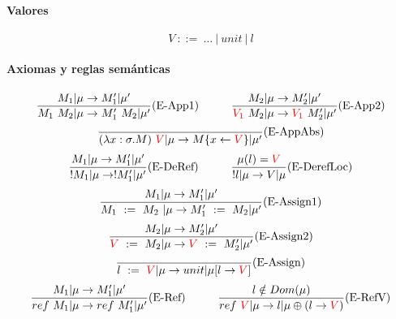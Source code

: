 \documentclass[10pt,a4paper]{article}
\begin{document}
\paragraph{Valores}
$$V~::=~\dots~|~unit~|~l$$

\paragraph{Axiomas y reglas semánticas}
\begin{equation*}
\frac{M_1|\mu\to M'_1|\mu'}{M_1~M_2|\mu\to M'_1~M_2|\mu'}(\text{E-App1})\hspace*{1cm}\frac{M_2|\mu\to M'_2|\mu'}{\color{red}V_1\color{black}~M_2|\mu\to \color{red}V_1\color{black}~M'_2|\mu'}(\text{E-App2})
\end{equation*}
\vspace*{5mm}
\begin{equation*}
\frac{}{(\lambda x: \sigma . M)~\color{red}V\color{black}|\mu\to M\{x\leftarrow\color{red}V\color{black}\}|\mu'}(\text{E-AppAbs})
\end{equation*}
\vspace*{5mm}
\begin{equation*}
\frac{M_1|\mu\to M'_1|\mu'}{!M_1|\mu\to !M_1'|\mu'}(\text{E-DeRef})\hspace*{1cm}
\frac{\mu(l) = \color{red}V\color{black}}{!l|\mu\to V|\mu}(\text{E-DerefLoc})
\end{equation*}
\vspace*{5mm}
\begin{equation*}
\frac{M_1|\mu\to M'_1|\mu'}{M_1~:=~M_2~|\mu\to M'_1~:=~M_2|\mu'}(\text{E-Assign1})
\end{equation*}
\vspace*{5mm}
\begin{equation*}
\frac{M_2|\mu\to M'_2|\mu'}{\color{red}V\color{black}~:=~M_2|\mu\to \color{red}V\color{black}~:=~M'_2|\mu'}(\text{E-Assign2})
\end{equation*}
\vspace*{5mm}
\begin{equation*}
\frac{}{l~:=~\color{red}V\color{black}|\mu\to unit|\mu[l\to \color{red}V\color{black}]}(\text{E-Assign})
\end{equation*}
\vspace*{5mm}
\begin{equation*}
\frac{M_1|\mu\to M'_1|\mu'}{ref~M_1|\mu\to ref~M'_1|\mu'}(\text{E-Ref})\hspace*{1cm}
\frac{l\notin Dom(\mu)}{ref~\color{red}V\color{black}|\mu\to l|\mu\oplus(l\to \color{red}V\color{black})}(\text{E-RefV})
\end{equation*}
\end{document}
